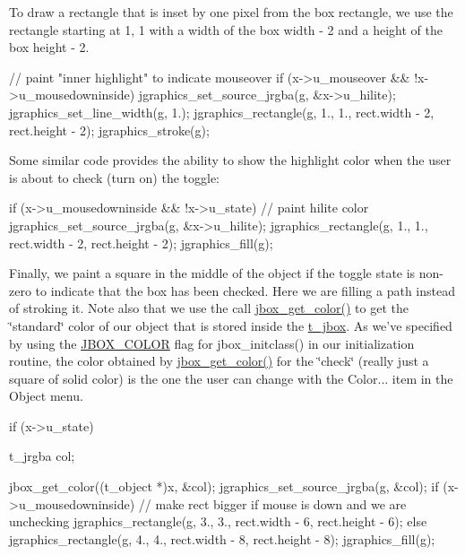 To draw a rectangle that is inset by one pixel from the box rectangle, we use the rectangle starting at 1, 1 with a width of the box width -\/ 2 and a height of the box height -\/ 2.


\begin{DoxyCode}
    // paint "inner highlight" to indicate mouseover
    if (x->u_mouseover && !x->u_mousedowninside) {
        jgraphics_set_source_jrgba(g, &x->u_hilite);
        jgraphics_set_line_width(g, 1.);
        jgraphics_rectangle(g, 1., 1., rect.width - 2, rect.height - 2);
        jgraphics_stroke(g);
    }
\end{DoxyCode}


Some similar code provides the ability to show the highlight color when the user is about to check (turn on) the toggle:


\begin{DoxyCode}
    if (x->u_mousedowninside && !x->u_state) {      // paint hilite color
        jgraphics_set_source_jrgba(g, &x->u_hilite);
        jgraphics_rectangle(g, 1., 1., rect.width - 2, rect.height - 2);
        jgraphics_fill(g);
    }
\end{DoxyCode}


Finally, we paint a square in the middle of the object if the toggle state is non-\/zero to indicate that the box has been checked. Here we are filling a path instead of stroking it. Note also that we use the call \hyperlink{group__jbox_ga03c4056e731c28342a8ee17e5b86558f}{jbox\_\-get\_\-color()} to get the \char`\"{}standard\char`\"{} color of our object that is stored inside the \hyperlink{structt__jbox}{t\_\-jbox}. As we've specified by using the \hyperlink{group__jbox_ga14cb28210886cfe0df0c34f71338faf8}{JBOX\_\-COLOR} flag for jbox\_\-initclass() in our initialization routine, the color obtained by \hyperlink{group__jbox_ga03c4056e731c28342a8ee17e5b86558f}{jbox\_\-get\_\-color()} for the \char`\"{}check\char`\"{} (really just a square of solid color) is the one the user can change with the Color... item in the Object menu.


\begin{DoxyCode}
    if (x->u_state) {
        t_jrgba col;

        jbox_get_color((t_object *)x, &col);
        jgraphics_set_source_jrgba(g, &col);
        if (x->u_mousedowninside)       // make rect bigger if mouse is down and 
      we are unchecking
            jgraphics_rectangle(g, 3., 3., rect.width - 6, rect.height - 6);
        else
            jgraphics_rectangle(g, 4., 4., rect.width - 8, rect.height - 8);
        jgraphics_fill(g);
    }
\end{DoxyCode}


